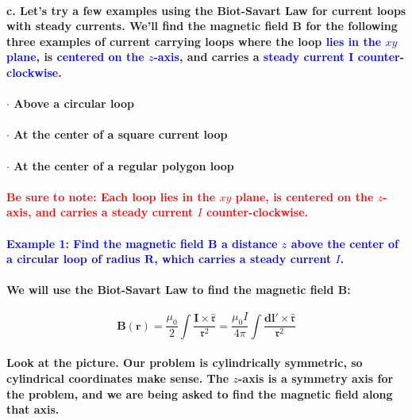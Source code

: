 \documentclass{article}
\begin{document}
\paragraph{\indent c. Let's try a few examples using the Biot-Savart Law for current loops with steady currents. We'll find the magnetic field $\boldsymbol{B}$ for the following three examples of current carrying loops where the loop \textcolor{blue}{lies in the $xy$ plane}, is \textcolor{blue}{centered on the $z$-axis}, and carries a \textcolor{blue}{steady current $\boldsymbol{I}$ counter-clockwise}.}
\paragraph{\indent\indent $\cdot$ Above a circular loop}
\paragraph{\indent\indent $\cdot$ At the center of a square current loop}
\paragraph{\indent\indent $\cdot$ At the center of a regular polygon loop}
\paragraph{\textcolor{red}{Be sure to note: Each loop lies in the $xy$ plane, is centered on the $z$-axis, and carries a steady current $I$ counter-clockwise.}}
\paragraph{\textcolor{blue}{Example 1: Find the magnetic field $\boldsymbol{B}$ a distance $z$ above the center of a circular loop of radius $\boldsymbol{R}$, which carries a steady current $I$.}}
\paragraph{\indent We will use the Biot-Savart Law to find the magnetic field $\boldsymbol{B}$:}
\begin{equation*}
    \boldsymbol{B}(\boldsymbol{r})=\frac{\mu_0}{2}\int\frac{\boldsymbol{I}\times\hat{\boldsymbol{\mathfrak{r}}}}{\mathfrak{r}^2}=\frac{\mu_0I}{4\pi}\int\frac{\boldsymbol{dl'}\times\hat{\boldsymbol{\mathfrak{r}}}}{\mathfrak{r}^2}
\end{equation*}
\paragraph{Look at the picture. Our problem is cylindrically symmetric, so cylindrical coordinates make sense. The $z$-axis is a symmetry axis for the problem, and we are being asked to find the magnetic field along that axis.}
\end{document}
